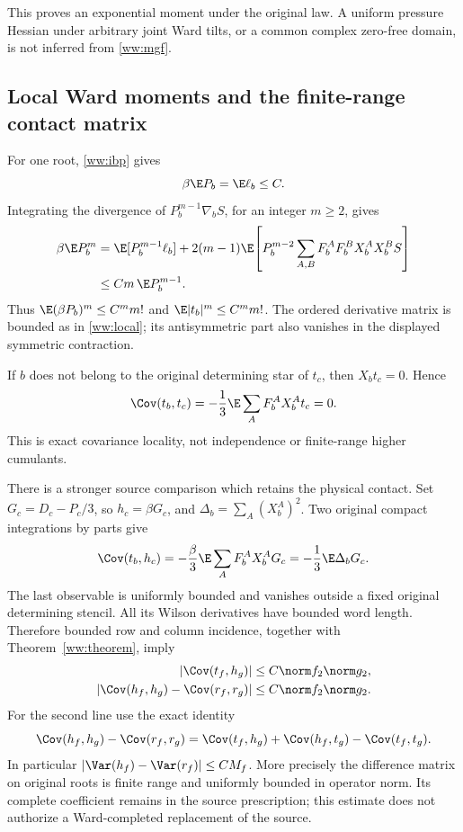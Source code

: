 This proves an exponential moment under the original law. A uniform pressure Hessian under arbitrary joint Ward tilts, or a common complex zero-free domain, is not inferred from \eqref{ww:mgf}.

\subsection{Local Ward moments and the finite-range contact matrix}

For one root, \eqref{ww:ibp} gives
\begin{equation}
 \beta\E P_b=\E\ell_b\le C.
 \label{ww:force2}
\end{equation}
Integrating the divergence of $P_b^{m-1}\nabla_bS$, for an integer $m\ge2$, gives
\begin{align}
 \beta\E P_b^m
 &=\E[P_b^{m-1}\ell_b]
   +2(m-1)\E\!\left[
       P_b^{m-2}\sum_{A,B}F_b^AF_b^BX_b^AX_b^BS\right]\notag\\
 &\le Cm\,\E P_b^{m-1}.
 \label{ww:recursion}
\end{align}
Thus $\E(\beta P_b)^m\le C^mm!$ and $\E|t_b|^m\le C^mm!$.
The ordered derivative matrix is bounded as in \eqref{ww:local}; its antisymmetric part also vanishes in the displayed symmetric contraction.

If $b$ does not belong to the original determining star of $t_c$, then $X_bt_c=0$. Hence
\begin{equation}
 \Cov(t_b,t_c)
 =-\frac13\E\sum_AF_b^AX_b^At_c=0.
 \label{ww:finitecov}
\end{equation}
This is exact covariance locality, not independence or finite-range higher cumulants.

There is a stronger source comparison which retains the physical contact. Set
$G_c=D_c-P_c/3$, so $h_c=\beta G_c$, and
$\Delta_b=\sum_A(X_b^A)^2$. Two original compact integrations by parts give
\begin{equation}
 \Cov(t_b,h_c)
 =-\frac{\beta}{3}\E\sum_AF_b^AX_b^AG_c
 =-\frac13\E\Delta_bG_c.
 \label{ww:contact}
\end{equation}
The last observable is uniformly bounded and vanishes outside a fixed original determining stencil. All its Wilson derivatives have bounded word length. Therefore bounded row and column incidence, together with Theorem~\ref{ww:theorem}, imply
\begin{align}
 |\Cov(t_f,h_g)|&\le C\norm f_2\norm g_2,\notag\\
 |\Cov(h_f,h_g)-\Cov(r_f,r_g)|
 &\le C\norm f_2\norm g_2.
 \label{ww:covdifference}
\end{align}
For the second line use the exact identity
\[
 \Cov(h_f,h_g)-\Cov(r_f,r_g)
 =\Cov(t_f,h_g)+\Cov(h_f,t_g)-\Cov(t_f,t_g).
\]
In particular $|\Var(h_f)-\Var(r_f)|\le CM_f$. More precisely the difference matrix on original roots is finite range and uniformly bounded in operator norm. Its complete coefficient remains in the source prescription; this estimate does not authorize a Ward-completed replacement of the source.

